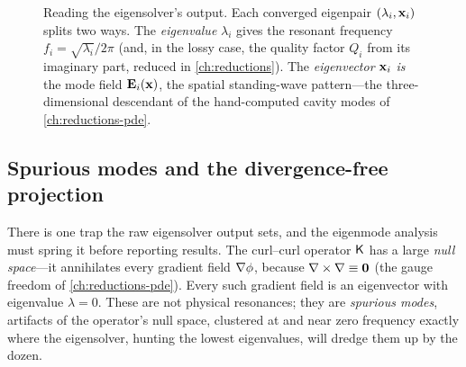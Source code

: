 \begin{figure}[t]
\centering
{}
\caption[From eigenpair to physical product]{Reading the eigensolver's output.
Each converged eigenpair $(\lambda_i,\mathbf{x}_i)$ splits two ways. The
\emph{eigenvalue} $\lambda_i$ gives the resonant frequency $f_i=\sqrt{\lambda_i}/
2\pi$ (and, in the lossy case, the quality factor $Q_i$ from its imaginary part,
reduced in \cref{ch:reductions}). The \emph{eigenvector} $\mathbf{x}_i$ \emph{is} the
mode field $\mathbf{E}_i(\mathbf{x})$, the spatial standing-wave pattern---the
three-dimensional descendant of the hand-computed cavity modes of
\cref{ch:reductions-pde}.}
\label{fig:readout}
\end{figure}

\subsection{Spurious modes and the divergence-free projection}

There is one trap the raw eigensolver output sets, and the eigenmode analysis must
spring it before reporting results. The curl--curl operator $\mathsf{K}$ has a large
\emph{null space}---it annihilates every gradient field $\nabla\phi$, because
$\nabla\times\nabla\equiv\mathbf 0$ (the gauge freedom of \cref{ch:reductions-pde}). Every
such gradient field is an eigenvector with eigenvalue $\lambda=0$. These are not
physical resonances; they are \emph{spurious modes}, artifacts of the operator's
null space, clustered at and near zero frequency exactly where the eigensolver,
hunting the lowest eigenvalues, will dredge them up by the dozen.

